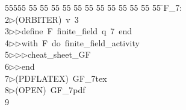 %
%
\begin{tabbing}
55555 \= 55 \= 55 \= 55 \= 55 \= 55 \= 55 \= 55 \= 55 \= 55 \= 55 \= 55 \= 55 \= \>F\_7:\\[0pt]
2\>$\triangleright$\>(ORBITER)\ v\ 3\ \\[0pt]
3\>$\triangleright$\>$\triangleright$\>define\ F\ finite\_field\ q\ 7\ end\ \\[0pt]
4\>$\triangleright$\>$\triangleright$\>with\ F\ do\ finite\_field\_activity\ \\[0pt]
5\>$\triangleright$\>$\triangleright$\>$\triangleright$\>cheat\_sheet\_GF\ \\[0pt]
6\>$\triangleright$\>$\triangleright$\>end\\[0pt]
7\>$\triangleright$\>(PDFLATEX)\ GF\_7tex\\[0pt]
8\>$\triangleright$\>(OPEN)\ GF\_7pdf\\[0pt]
9\>\end{tabbing}
